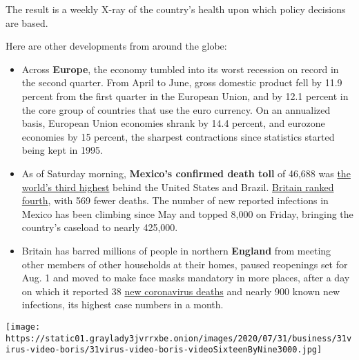The result is a weekly X-ray of the country's health upon which policy
decisions are based.

Here are other developments from around the globe:

\begin{itemize}
\item
  Across \textbf{Europe}, the economy tumbled into its worst recession
  on record in the second quarter. From April to June, gross domestic
  product fell by 11.9 percent from the first quarter in the European
  Union, and by 12.1 percent in the core group of countries that use the
  euro currency. On an annualized basis, European Union economies shrank
  by 14.4 percent, and eurozone economies by 15 percent, the sharpest
  contractions since statistics started being kept in 1995.
\item
  As of Saturday morning, \textbf{Mexico's confirmed death toll} of
  46,688 was
  \href{https://www.nytimes3xbfgragh.onion/interactive/2020/world/americas/mexico-coronavirus-cases.html}{the
  world's third highest} behind the United States and Brazil.
  \href{https://www.nytimes3xbfgragh.onion/interactive/2020/world/europe/united-kingdom-coronavirus-cases.html}{Britain
  ranked fourth}, with 569 fewer deaths. The number of new reported
  infections in Mexico has been climbing since May and topped 8,000 on
  Friday, bringing the country's caseload to nearly 425,000.
\item
  Britain has barred millions of people in northern \textbf{England}
  from meeting other members of other households at their homes, paused
  reopenings set for Aug. 1 and moved to make face masks mandatory in
  more places, after a day on which it reported 38
  \href{https://www.nytimes3xbfgragh.onion/interactive/2020/world/europe/united-kingdom-coronavirus-cases.html}{new
  coronavirus deaths} and nearly 900 known new infections, its highest
  case numbers in a month.
\end{itemize}

\texttt{[image: https://static01.graylady3jvrrxbe.onion/images/2020/07/31/business/31virus-video-boris/31virus-video-boris-videoSixteenByNine3000.jpg]}

